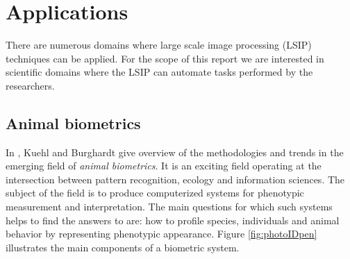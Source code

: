 \section{Applications}
\label{sec:app}

There are numerous domains where large scale image processing (LSIP) techniques can be applied. For the scope of this report we are interested in scientific domains where the LSIP can automate tasks performed by the researchers.

\subsection{Animal biometrics}
\label{sec:anim_biom}
In \cite{Kuehl2013}, Kuehl and Burghardt give overview of the methodologies and trends in the emerging field of {\em animal biometrics}. It is an exciting field operating at the intersection between pattern recognition, ecology and information sciences. The subject of the field is to produce computerized systems for phenotypic measurement and interpretation. The main questions for which such systems helps to find the answers to are: how to profile species, individuals and animal behavior by representing phenotypic appearance. Figure \ref{fig:photoIDpen} illustrates the main components of a biometric system. 

